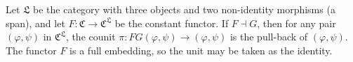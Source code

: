 Let $\mathfrak{L}$ be the category with three objects and two non-identity morphisms (a span), and let $F : \mathfrak{C} \to \mathfrak{C}^{\mathfrak{L}}$ be the constant functor. If $F \dashv G$, then for any pair $(\varphi, \psi)$ in $\mathfrak{C}^{\mathfrak{L}}$, the counit $\pi : FG(\varphi, \psi) \to (\varphi, \psi)$ is the pull-back of $(\varphi, \psi)$. The functor $F$ is a full embedding, so the unit may be taken as the identity.
